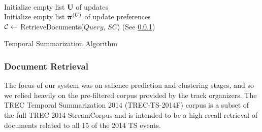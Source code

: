 \begin{algorithm}%
 ~\\
 Initialize empty list $\mathbf{U}$ of updates\\
 Initialize empty list $\boldsymbol{\operatorname{\boldsymbol{\pi}}}^{(U)}$ of update preferences\\
 $\operatorname{\mathcal{C}} \gets $ RetrieveDocuments($Query$, $SC$) (See \cref{subsec:Document Retrieval})\\
 \caption{Temporal Summarization Algorithm}
\end{algorithm}

\subsubsection{Document Retrieval}\label{subsec:Document Retrieval}

The focus of our system was on salience prediction and clustering stages, and
so we relied heavily on the pre-filtered corpus provided by the track 
organizers. The TREC Temporal Summarization 2014 (TREC-TS-2014F) corpus is
a subset of the full TREC 2014 StreamCorpus and is
intended to be a high recall retrieval of documents related to all 15 of 
the 2014 TS events. 


